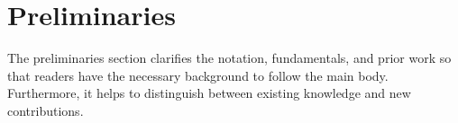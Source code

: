 
\chapter{Preliminaries}
\label{ch:preliminaries}

The preliminaries section clarifies the notation, fundamentals, and prior work so that readers have the necessary background to follow the main body.
Furthermore, it helps to distinguish between existing knowledge and new contributions.









